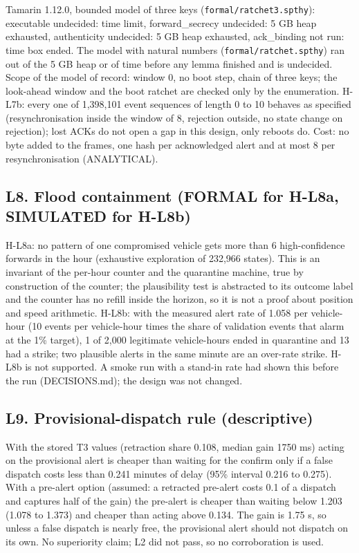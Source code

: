 Tamarin 1.12.0, bounded model of three keys (\texttt{formal/ratchet3.spthy}): executable undecided: time limit, forward\_secrecy undecided: 5 GB heap exhausted, authenticity undecided: 5 GB heap exhausted, ack\_binding not run: time box ended. The model with natural numbers (\texttt{formal/ratchet.spthy}) ran out of the 5 GB heap or of time before any lemma finished and is undecided. Scope of the model of record: window 0, no boot step, chain of three keys; the look-ahead window and the boot ratchet are checked only by the enumeration. H-L7b: every one of 1,398,101 event sequences of length 0 to 10 behaves as specified (resynchronisation inside the window of 8, rejection outside, no state change on rejection); lost ACKs do not open a gap in this design, only reboots do. Cost: no byte added to the frames, one hash per acknowledged alert and at most 8 per resynchronisation (ANALYTICAL).

\subsection*{L8. Flood containment (FORMAL for H-L8a, SIMULATED for H-L8b)}

H-L8a: no pattern of one compromised vehicle gets more than 6 high-confidence forwards in the hour (exhaustive exploration of 232,966 states). This is an invariant of the per-hour counter and the quarantine machine, true by construction of the counter; the plausibility test is abstracted to its outcome label and the counter has no refill inside the horizon, so it is not a proof about position and speed arithmetic. H-L8b: with the measured alert rate of 1.058 per vehicle-hour (10 events per vehicle-hour times the share of validation events that alarm at the 1\% target), 1 of 2,000 legitimate vehicle-hours ended in quarantine and 13 had a strike; two plausible alerts in the same minute are an over-rate strike. H-L8b is not supported. A smoke run with a stand-in rate had shown this before the run (DECISIONS.md); the design was not changed.

\subsection*{L9. Provisional-dispatch rule (descriptive)}

With the stored T3 values (retraction share 0.108, median gain 1750 ms) acting on the provisional alert is cheaper than waiting for the confirm only if a false dispatch costs less than 0.241 minutes of delay (95\% interval 0.216 to 0.275). With a pre-alert option (assumed: a retracted pre-alert costs 0.1 of a dispatch and captures half of the gain) the pre-alert is cheaper than waiting below 1.203 (1.078 to 1.373) and cheaper than acting above 0.134. The gain is 1.75 s, so unless a false dispatch is nearly free, the provisional alert should not dispatch on its own. No superiority claim; L2 did not pass, so no corroboration is used.

